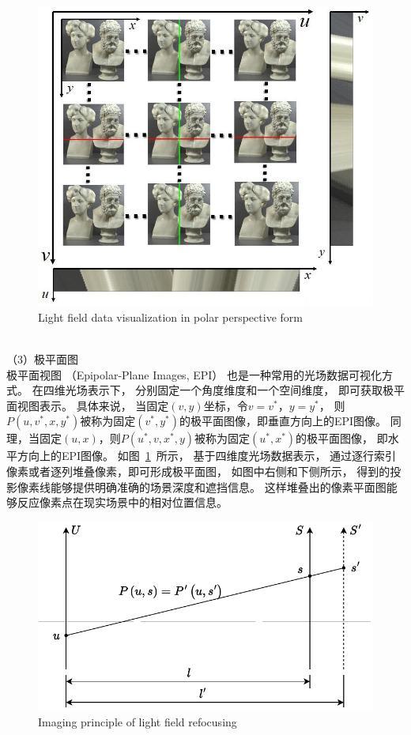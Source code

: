 \begin{figure}[t]
	\centering
	\includegraphics[width=0.75\linewidth]{figures/chapter2/epi_photos}
	{Light field data visualization in polar perspective form}  
	\label{cpt2_fig6:epi_photos}
\end{figure}
%
%
%
\\
%
%
%
%
\indent
（3）极平面图
\\
%
%
%
%
\indent
极平面视图
（Epipolar-Plane Images, EPI）
也是一种常用的光场数据可视化方式。
在四维光场表示下，
分别固定一个角度维度和一个空间维度，
即可获取极平面视图表示。
具体来说，
当固定$(v, y)$坐标，令$v=v^{*}$，$y=y^{*}$，
则$ P(u, v^{*}, x, y^{*})$被称为固定$(v^{*}, y^{*})$的极平面图像，即垂直方向上的EPI图像。
同理，当固定$(u, x)$，则$ P(u^{*}, v, x^{*}, y)$被称为固定$(u^{*}, x^{*})$的极平面图像，
即水平方向上的EPI图像。
如图~\ref{cpt2_fig6:epi_photos}~所示，
基于四维度光场数据表示，
通过逐行索引像素或者逐列堆叠像素，即可形成极平面图，
如图中右侧和下侧所示，
得到的投影像素线能够提供明确准确的场景深度和遮挡信息。
这样堆叠出的像素平面图能够反应像素点在现实场景中的相对位置信息。
\begin{figure}[t]
	\centering
	\includegraphics[width=0.82\linewidth]{figures/chapter2/re_focus}
	{Imaging principle of light field refocusing}  
	\label{chpt2:fig:refocus}
\end{figure}

